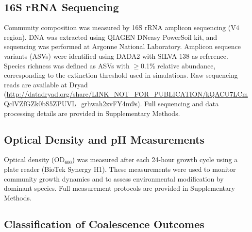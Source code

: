 \subsection*{16S rRNA Sequencing}
\label{sec:methods:sequencing}

Community composition was measured by 16S rRNA amplicon sequencing (V4 region). DNA was extracted using QIAGEN DNeasy PowerSoil kit, and sequencing was performed at Argonne National Laboratory. Amplicon sequence variants (ASVs) were identified using DADA2\citep{Callahan2016} with SILVA 138\citep{Quast2013} as reference. Species richness was defined as ASVs with $\geq$0.1\% relative abundance, corresponding to the extinction threshold used in simulations. Raw sequencing reads are available at Dryad (\url{http://datadryad.org/share/LINK_NOT_FOR_PUBLICATION/kQACU7LCmQclVZfGZk0bS5ZPUVL_grhwah2zvFY4m9s}). Full sequencing and data processing details are provided in Supplementary Methods.


\subsection*{Optical Density and pH Measurements}
\label{sec:methods:od_ph}

Optical density (OD$_{600}$) was measured after each 24-hour growth cycle using a plate reader (BioTek Synergy H1).  These measurements were used to monitor community growth dynamics and to assess environmental modification by dominant species. Full measurement protocols are provided in Supplementary Methods.


\subsection*{Classification of Coalescence Outcomes}
\label{sec:methods:classification}

